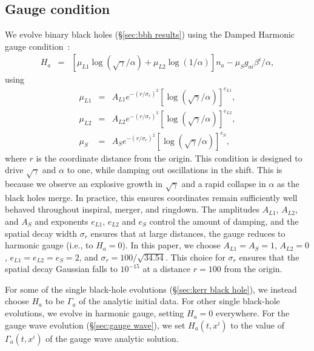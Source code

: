 \documentclass[12pt]{caltech_thesis}
\begin{document}
\begin{bibunit}[unsrtnat]
\subsection{Gauge condition}\label{sec:dh_gauge}
We evolve binary black holes (\S\ref{sec:bbh results}) using the Damped Harmonic
gauge condition~\cite{Szilagyi:2009qz, Deppe2018:uye}:
\begin{eqnarray}
  H_a &=& \left[\mu_{L1} \log\left(\sqrt{\gamma}/\alpha\right) + \mu_{L2}
          \log\left(1/\alpha\right)\right] n_a - \mu_S g_{ai} \beta^i / \alpha,
\end{eqnarray}
using
\begin{eqnarray}
  \mu_{L1} &=& A_{L1} e^{-(r/\sigma_r)^2}
               \left[\log(\sqrt{\gamma}/\alpha)\right]^{e_{L1}},\\
  \mu_{L2} &=& A_{L2} e^{-(r/\sigma_r)^2}
               \left[\log(\sqrt{\gamma}/\alpha)\right]^{e_{L2}},\\
  \mu_{S} &=& A_{S} e^{-(r/\sigma_r)^2}
              \left[\log(\sqrt{\gamma}/\alpha)\right]^{e_{S}},
\end{eqnarray} where $r$ is the coordinate distance from the origin. This
condition is designed to drive $\sqrt{\gamma}$ and $\alpha$ to one, while damping
out oscillations in the shift. This is because we observe an explosive growth in
$\sqrt{\gamma}$ and a rapid collapse in $\alpha$ as the black holes merge. In
practice, this ensures coordinates remain sufficiently well behaved throughout
inspiral, merger, and ringdown. The amplitudes $A_{L1}$, $A_{L2}$, and $A_{S}$ and
exponents $e_{L1}$, $e_{L2}$ and $e_{S}$ control the amount of damping, and the
spatial decay width $\sigma_r$ ensures that at large distances, the gauge reduces
to harmonic gauge (i.e., to $H_a = 0$). In this paper, we choose
$A_{L1}=A_S = 1$, $A_{L2}=0$, $e_{L1}=e_{L2}=e_{S}=2$, and $\sigma_r = 100 /
\sqrt{34.54}$. This choice for $\sigma_r$ ensures that the spatial decay
Gaussian falls to $10^{-15}$ at a distance $r=100$ from the origin.

For some of the single black-hole evolutions (\S\ref{sec:kerr black hole}), we
instead choose $H_a$ to be $\Gamma_a$ of the analytic initial data. For other
single black-hole evolutions, we evolve in harmonic gauge, setting $H_a=0$
everywhere.  For the gauge wave evolution (\S\ref{sec:gauge wave}), we set
$H_a(t, x^i)$ to the value of $\Gamma_a(t, x^i)$ of the gauge wave analytic
solution.


\end{bibunit}
\end{document}
